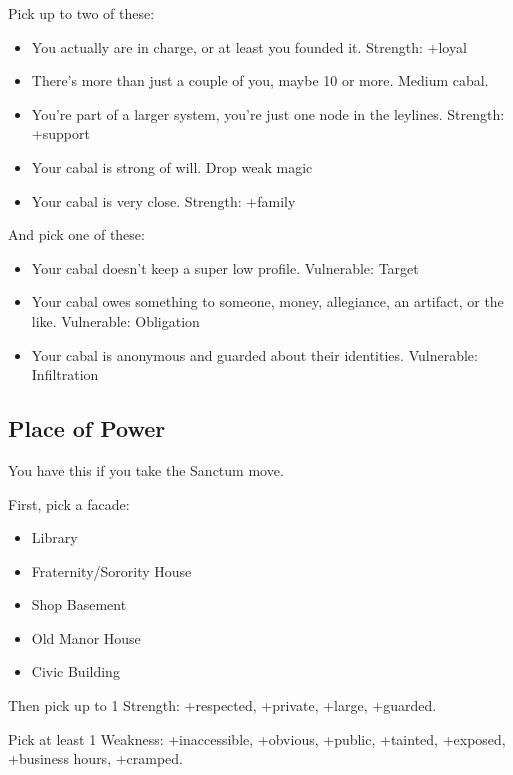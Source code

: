 \documentclass[
  oneside,
  statementpaper,
  9pt]{memoir}
\begin{document}
Pick up to two of these:

\begin{itemize}
\tightlist
\item
  You actually are in charge, or at least you founded it. Strength:
  +loyal
\item
  There's more than just a couple of you, maybe 10 or more. Medium
  cabal.
\item
  You're part of a larger system, you're just one node in the leylines.
  Strength: +support
\item
  Your cabal is strong of will. Drop weak magic
\item
  Your cabal is very close. Strength: +family
\end{itemize}

And pick one of these:

\begin{itemize}
\tightlist
\item
  Your cabal doesn't keep a super low profile. Vulnerable: Target
\item
  Your cabal owes something to someone, money, allegiance, an artifact,
  or the like. Vulnerable: Obligation
\item
  Your cabal is anonymous and guarded about their identities.
  Vulnerable: Infiltration
\end{itemize}

\hypertarget{place-of-power-1}{%
\subsection{Place of Power}\label{place-of-power-1}}

You have this if you take the Sanctum move.

First, pick a facade:

\begin{itemize}
\tightlist
\item
  Library
\item
  Fraternity/Sorority House
\item
  Shop Basement
\item
  Old Manor House
\item
  Civic Building
\end{itemize}

Then pick up to 1 Strength: +respected, +private, +large, +guarded.

Pick at least 1 Weakness: +inaccessible, +obvious, +public, +tainted,
+exposed, +business hours, +cramped.
\end{document}
